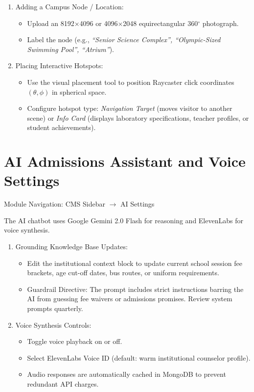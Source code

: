 \documentclass[11pt,a4paper,oneside]{report}
\def\textbf#1{#1}
\def\texttt#1{#1}
\def\&{and}
\begin{document}
\begin{enumerate}
  \item \textbf{Adding a Campus Node / Location:}
        \begin{itemize}
          \item Upload an \textbf{8192$\times$4096} or \textbf{4096$\times$2048} equirectangular 360$^\circ$ photograph.
          \item Label the node (e.g., \textit{``Senior Science Complex'', ``Olympic-Sized Swimming Pool'', ``Atrium''}).
        \end{itemize}
  \item \textbf{Placing Interactive Hotspots:}
        \begin{itemize}
          \item Use the visual placement tool to position Raycaster click coordinates $(\theta, \phi)$ in spherical space.
          \item Configure hotspot type: \textit{Navigation Target} (moves visitor to another scene) or \textit{Info Card} (displays laboratory specifications, teacher profiles, or student achievements).
        \end{itemize}
\end{enumerate}

\section{AI Admissions Assistant \& Voice Settings}

\textbf{Module Navigation:} CMS Sidebar $\rightarrow$ \texttt{AI Settings}

The AI chatbot uses Google Gemini 2.0 Flash for reasoning and ElevenLabs for voice synthesis.

\begin{enumerate}
  \item \textbf{Grounding Knowledge Base Updates:}
        \begin{itemize}
          \item Edit the institutional context block to update current school session fee brackets, age cut-off dates, bus routes, or uniform requirements.
          \item \textbf{Guardrail Directive:} The prompt includes strict instructions barring the AI from guessing fee waivers or admissions promises. Review system prompts quarterly.
        \end{itemize}
  \item \textbf{Voice Synthesis Controls:}
        \begin{itemize}
          \item Toggle voice playback on or off.
          \item Select ElevenLabs Voice ID (default: warm institutional counselor profile).
          \item Audio responses are automatically cached in MongoDB to prevent redundant API charges.
        \end{itemize}
\end{enumerate}
\end{document}
